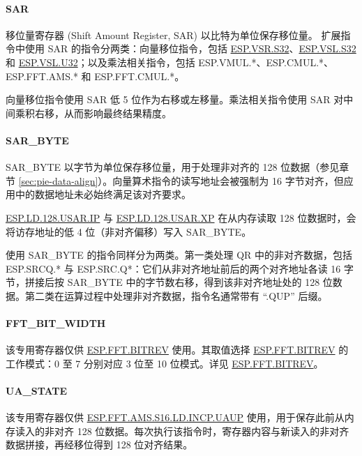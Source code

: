 \documentclass[main\_\_CN.tex]{subfiles}
\begin{document}
\paragraph{SAR}

移位量寄存器 (Shift Amount Register, SAR) 以比特为单位保存移位量。\chipname{} 扩展指令中使用 SAR 的指令分两类：向量移位指令，包括 \hyperref[instruction:ESPVSRS32]{ESP.VSR.S32}、\hyperref[instruction:ESPVSLS32]{ESP.VSL.S32} 和 \hyperref[instruction:ESPVSLU32]{ESP.VSL.U32}；以及乘法相关指令，包括 ESP.VMUL.*、ESP.CMUL.*、ESP.FFT.AMS.* 和 ESP.FFT.CMUL.*。

向量移位指令使用 SAR 低 5 位作为右移或左移量。乘法相关指令使用 SAR 对中间乘积右移，从而影响最终结果精度。

\paragraph{SAR\_BYTE}

SAR\_BYTE 以字节为单位保存移位量，用于处理非对齐的 128 位数据（参见章节 \ref{sec:pie-data-align}）。向量算术指令的读写地址会被强制为 16 字节对齐，但应用中的数据地址未必始终满足该对齐要求。

\hyperref[instruction:ESPLD128USARIP]{ESP.LD.128.USAR.IP} 与 \hyperref[instruction:ESPLD128USARXP]{ESP.LD.128.USAR.XP} 在从内存读取 128 位数据时，会将访存地址的低 4 位（非对齐偏移）写入 SAR\_BYTE。

使用 SAR\_BYTE 的指令同样分为两类。第一类处理 QR 中的非对齐数据，包括 ESP.SRCQ.* 与 ESP.SRC.Q*：它们从非对齐地址前后的两个对齐地址各读 16 字节，拼接后按 SAR\_BYTE 中的字节数右移，得到该非对齐地址处的 128 位数据。第二类在运算过程中处理非对齐数据，指令名通常带有 ``.QUP'' 后缀。





\paragraph{FFT\_BIT\_WIDTH}

该专用寄存器仅供 \hyperref[instruction:ESPFFTBITREV]{ESP.FFT.BITREV} 使用。其取值选择 \hyperref[instruction:ESPFFTBITREV]{ESP.FFT.BITREV} 的工作模式：0 至 7 分别对应 3 位至 10 位模式。详见 \hyperref[instruction:ESPFFTBITREV]{ESP.FFT.BITREV}。

\paragraph{UA\_STATE}

该专用寄存器仅供 \hyperref[instruction:ESPFFTAMSS16LDINCPUAUP]{ESP.FFT.AMS.S16.LD.INCP.UAUP} 使用，用于保存此前从内存读入的非对齐 128 位数据。每次执行该指令时，寄存器内容与新读入的非对齐数据拼接，再经移位得到 128 位对齐结果。
\end{document}
